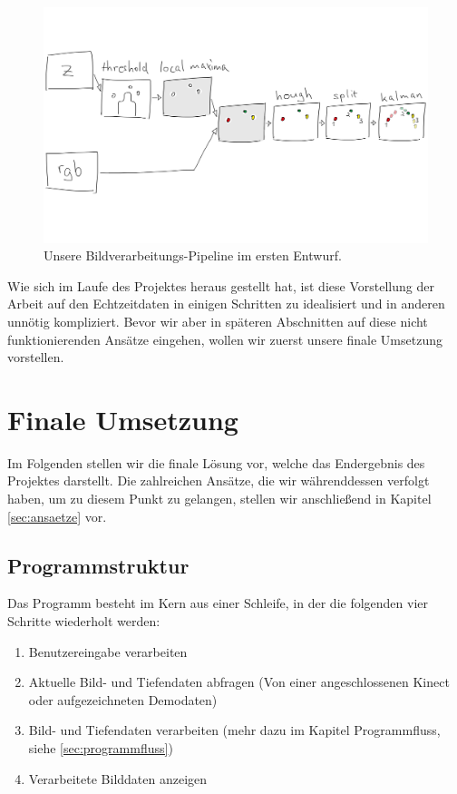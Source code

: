 \documentclass[12pt,a4paper,ngerman]{scrartcl}
\begin{document}
\begin{figure}[H]
    \centering
    \includegraphics[scale=0.14]{img/processing-pipeline.png}
    \caption{Unsere Bildverarbeitungs-Pipeline im ersten Entwurf.}
    \label{ourpipeline}
\end{figure}

Wie sich im Laufe des Projektes heraus gestellt hat, ist diese Vorstellung der Arbeit
auf den Echtzeitdaten in einigen Schritten zu idealisiert und in anderen unnötig
kompliziert. Bevor wir aber in späteren Abschnitten auf diese nicht funktionierenden
Ansätze eingehen, wollen wir zuerst unsere finale Umsetzung vorstellen.

\section{Finale Umsetzung}
\label{sec:final}

Im Folgenden stellen wir die finale Lösung vor, welche das Endergebnis des
Projektes darstellt. Die zahlreichen Ansätze, die wir währenddessen verfolgt haben, um zu
diesem Punkt zu gelangen, stellen wir anschließend in Kapitel \ref{sec:ansaetze} vor.

\subsection{Programmstruktur}

Das Programm besteht im Kern aus einer Schleife, in der die folgenden vier Schritte  wiederholt werden:
\begin{enumerate}
  \item Benutzereingabe verarbeiten
  \item Aktuelle Bild- und Tiefendaten abfragen (Von einer angeschlossenen Kinect oder aufgezeichneten Demodaten)
  \item Bild- und Tiefendaten verarbeiten (mehr dazu im Kapitel Programmfluss, siehe \ref{sec:programmfluss})
  \item Verarbeitete Bilddaten anzeigen
\end{enumerate}
\end{document}
